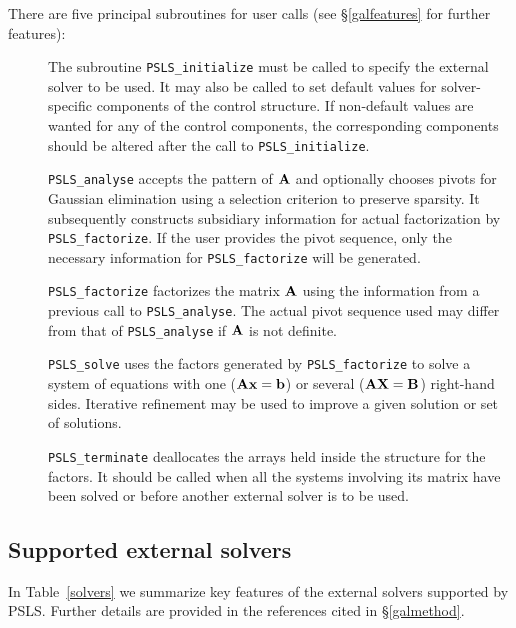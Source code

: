 \documentclass{galahad}
\newcommand{\packagename}{PSLS}
\begin{document}
\noindent There are five principal subroutines for user calls (see
\S\ref{galfeatures} for further features):

\begin{description}

\item[] The subroutine {\tt \packagename\_initialize} must be called to
specify the external solver to be used.
It may also be called to set default values
for solver-specific components of the control structure.
If non-default values are
wanted for any of the control components, the corresponding components
should be altered after the call to {\tt \packagename\_initialize}.

\item[] {\tt \packagename\_analyse} accepts the pattern of ${\mathbf{A}}$
 and optionally chooses pivots
 for Gaussian elimination using a selection criterion to preserve
 sparsity.  It subsequently constructs subsidiary information for
 actual factorization by {\tt \packagename\_factorize}. If the user provides
 the pivot sequence, only the necessary information for
 {\tt \packagename\_factorize} will be generated.

\item[] {\tt \packagename\_factorize} factorizes the matrix ${\mathbf{A}}$ using the
 information
 from a previous call to {\tt \packagename\_analyse}. The actual pivot sequence
 used may differ from that of {\tt \packagename\_analyse} if ${\mathbf{A}}$ is not
definite.

\item[] {\tt \packagename\_solve} uses the factors generated by
  {\tt \packagename\_factorize} to
  solve a system of equations with one (${\mathbf{A}} {\mathbf{x}} = {\mathbf{b}}$)
  or several (${\mathbf{A}} {\mathbf{X}} = {\mathbf{B}}$) right-hand sides.
  Iterative refinement may be used to improve a given solution
  or set of solutions.

\item[] {\tt \packagename\_terminate} deallocates the arrays held inside the
  structure for the factors. It should be called
  when all the systems involving its matrix have been solved
  or before another external solver is to be used.
\end{description}

\subsection{Supported external solvers}

In Table~\ref{solvers} we summarize key features of
the external solvers supported by \packagename. Further details
are provided in the references cited in \S\ref{galmethod}.
\end{document}
